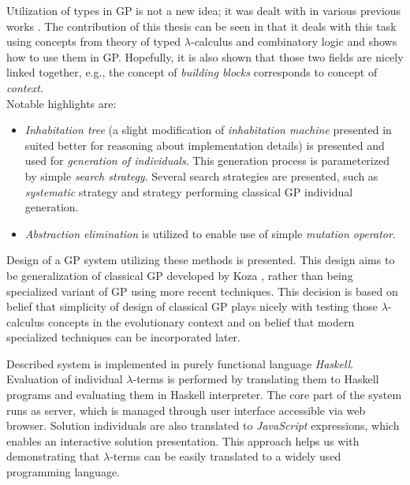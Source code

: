 \documentclass[12pt,a4paper]{report}
\newcommand{\lterms}{$\lambda$-terms\xspace}
\begin{document}
Utilization of types in GP is not a new idea; 
it was dealt with in various previous works 
\cite{yu01,montana95,haynes96,olsson94}.
The contribution of this thesis can be seen 
in that it deals with this task using concepts from
theory of typed $\lambda$-calculus and combinatory logic
and shows how to use them in GP.
Hopefully, it is also shown that those two fields are
nicely linked together, e.g., the concept of \textit{building blocks}
corresponds to concept of \textit{context}. \\
 
Notable highlights are: 
\begin{itemize}
 \item \textit{Inhabitation tree} (a slight modification 
   of \textit{inhabitation machine} presented in \cite{barendregt10}
   suited better for reasoning about implementation details) 
   is presented and used for \textit{generation of individuals}.
   This generation process is parameterized by simple 
   \textit{search strategy}. Several search strategies are presented,
   such as \textit{systematic} strategy and strategy performing
   classical GP individual generation.     
 \item \textit{Abstraction elimination} is utilized
   to enable use of simple \textit{mutation operator}.

\end{itemize}

Design of a GP system utilizing these methods is presented.
This design aims to be generalization of classical GP 
developed by Koza \cite{koza92}, rather than being 
specialized variant of GP using more recent techniques.
This decision is based on belief
that simplicity of design of classical GP plays nicely
with testing those $\lambda$-calculus concepts in 
the evolutionary context and on belief that modern specialized 
techniques can be incorporated later.
 
Described system is implemented in purely functional language 
\textit{Haskell}. Evaluation of individual \lterms is 
performed by translating them to
Haskell programs and evaluating them in Haskell interpreter. 
The core part of the system runs as server, which is 
managed through user interface accessible via
web browser. Solution individuals are also translated
to \textit{JavaScript} expressions, which enables  
an interactive solution presentation.
This approach helps us with demonstrating 
that \lterms can be easily translated to a 
widely used programming language.
\end{document}

